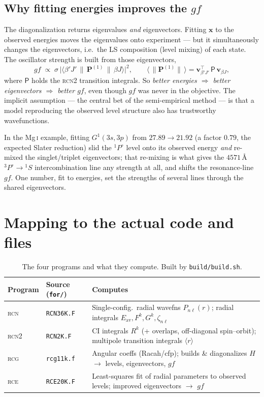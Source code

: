 \documentclass[11pt]{article}
\newcommand{\Fk}{F^{k}}
\newcommand{\Gk}{G^{k}}
\newcommand{\Rk}{R^{k}}
\newcommand{\znl}{\zeta_{n\ell}}
\newcommand{\Eav}{E_{\mathrm{av}}}
\newcommand{\prog}[1]{\textsc{#1}}
\newcommand{\file}[1]{\texttt{#1}}
\begin{document}
\subsection{Why fitting energies improves the $gf$}

The diagonalization returns eigenvalues \emph{and} eigenvectors. Fitting
$\mathbf{x}$ to the observed energies moves the eigenvalues onto experiment ---
but it simultaneously changes the eigenvectors, i.e.\ the LS composition (level
mixing) of each state. The oscillator strength is built from those eigenvectors,
\[
  gf \;\propto\; \sigma\,\big|\langle \beta' J' \,\|\,\mathbf{P}^{(1)}\,\|\,
  \beta J\rangle\big|^2,
  \qquad
  \langle\,\|\mathbf{P}^{(1)}\|\,\rangle
  = \mathbf{v}_{\beta'J'}^{\!\top}\, \mathsf{P}\, \mathbf{v}_{\beta J},
\]
where $\mathsf{P}$ holds the \prog{rcn2} transition integrals. So
\emph{better energies $\Rightarrow$ better eigenvectors $\Rightarrow$ better
$gf$}, even though $gf$ was never in the objective. The implicit assumption ---
the central bet of the semi-empirical method --- is that a model reproducing the
observed level structure also has trustworthy wavefunctions.

In the Mg\,\textsc{i} example, fitting $G^1(3s,3p)$ from $27.89\to21.92$ (a factor
$0.79$, the expected Slater reduction) slid the $^1P^\circ$ level onto its
observed energy \emph{and} re-mixed the singlet/triplet eigenvectors; that
re-mixing is what gives the $4571$\,\AA{} $^3P^\circ\!\to{}^1S$ intercombination
line any strength at all, and shifts the resonance-line $gf$. One number, fit to
energies, set the strengths of several lines through the shared eigenvectors.

\section{Mapping to the actual code and files}

\begin{table}[h]
\centering
\small
\begin{tabular}{@{}llp{7.4cm}@{}}
\toprule
Program & Source (\file{for/}) & Computes \\
\midrule
\prog{rcn}  & \file{RCN36K.F} & Single-config.\ radial wavefns $P_{n\ell}(r)$;
  radial integrals $\Eav,\Fk,\Gk,\znl$ \\
\prog{rcn2} & \file{RCN2K.F}  & CI integrals $\Rk$ (+ overlaps, off-diagonal
  spin--orbit); multipole transition integrals $\langle r\rangle$ \\
\prog{rcg}  & \file{rcg11k.f} & Angular coeffs (Racah/cfp); builds \&
  diagonalizes $H$ $\to$ levels, eigenvectors, $gf$ \\
\prog{rce}  & \file{RCE20K.F} & Least-squares fit of radial parameters to
  observed levels; improved eigenvectors $\to$ $gf$ \\
\bottomrule
\end{tabular}
\caption{The four programs and what they compute. Built by
\file{build/build.sh}.}
\end{table}
\end{document}
